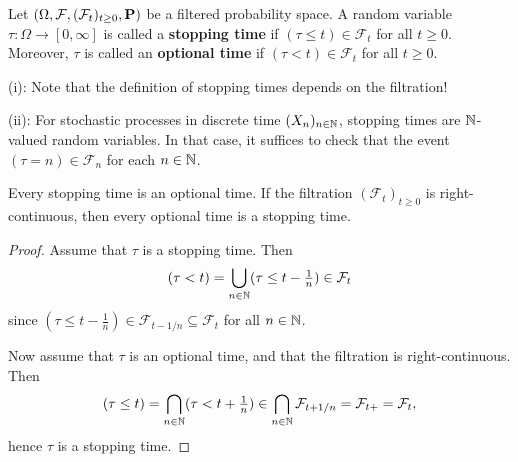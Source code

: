 \begin{definition}
    Let $(\Omega,\mathcal{F},(\mathcal{F}_t)_{t\ge 0},\mathbf{P})$ be a filtered probability space. A random variable $\tau:\Omega\to [0,\infty]$ is called a \textbf{stopping time} if $(\tau\le t)\in\mathcal{F}_t$ for all $t\ge 0$. Moreover, $\tau$ is called an \textbf{optional time} if $(\tau<t)\in\mathcal{F}_t$ for all $t\ge 0$.
\end{definition}

\begin{remark}
    (i): Note that the definition of stopping times depends on the filtration!
    
    (ii): For stochastic processes in discrete time $(X_n)_{n\in\mathbb{N}}$, stopping times are $\mathbb{N}$-valued random variables. In that case, it suffices to check that the event $(\tau=n)\in\mathcal{F}_n$ for each $n\in\mathbb{N}$.
\end{remark}

\begin{proposition}
\label{prop:stop-opt}
    Every stopping time is an optional time. If the filtration $(\mathcal{F}_t)_{t\ge 0}$ is right-continuous, then every optional time is a stopping time.
\end{proposition}

\begin{proof}
    Assume that $\tau$ is a stopping time. Then
    \begin{equation*}
        (\tau <t) = \bigcup_{n\in\mathbb{N}} (\tau\le t-\tfrac{1}{n}) \in\mathcal{F}_t
    \end{equation*}
    since $(\tau\le t-\frac{1}{n})\in\mathcal{F}_{t-1/n}\subseteq\mathcal{F}_t$ for all $n\in\mathbb{N}$.

    Now assume that $\tau$ is an optional time, and that the filtration is right-continuous. Then
    \begin{equation*}
        (\tau\le t) = \bigcap_{n\in\mathbb{N}}(\tau<t+\tfrac{1}{n}) \in\bigcap_{n\in\mathbb{N}}\mathcal{F}_{t+1/n} = \mathcal{F}_{t+} = \mathcal{F}_t,
    \end{equation*}
    hence $\tau$ is a stopping time.
\end{proof}

